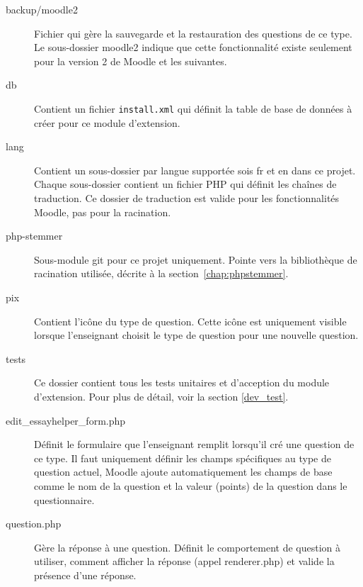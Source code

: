\begin{description}
 \item[backup/moodle2]
 Fichier qui g\`ere la sauvegarde et la restauration des questions de ce type.
 Le sous-dossier moodle2 indique que cette fonctionnalit\'e existe seulement pour la version 2 de Moodle et les suivantes.
 
 \item[db]
 
 Contient un fichier \texttt{install.xml} qui d\'efinit la table de base de donn\'ees \`a cr\'eer pour ce module d'extension.
 
 \item[lang]
 
 Contient un sous-dossier par langue support\'ee sois \og fr \fg{} et \og en \fg{} dans ce projet.
 Chaque sous-dossier contient un fichier PHP qui d\'efinit les cha\^ines de traduction.
 Ce dossier de traduction est valide pour les fonctionnalit\'es Moodle, pas pour la racination.
 
 \item[php-stemmer]
 
 Sous-module git pour ce projet uniquement.
 Pointe vers la biblioth\`eque de racination utilis\'ee,  d\'ecrite \`a la section~\ref{chap:phpstemmer}.
 
 \item[pix]
 
 Contient l'ic\^one du type de question.
 Cette ic\^one est uniquement visible lorsque l'enseignant choisit le type de question pour une nouvelle question.
 
 \item[tests]
 
 Ce dossier contient tous les tests unitaires et d'acception du module d'extension.
 Pour plus de d\'etail, voir la section \ref{dev_test}.
 
 \item[edit\_essayhelper\_form.php]
 
 D\'efinit le formulaire que l'enseignant remplit lorsqu'il cr\'e une question de ce type.
 Il faut uniquement d\'efinir les champs sp\'ecifiques au type de question actuel, Moodle ajoute automatiquement les champs de base comme le nom de la question et la valeur (points) de la question dans le questionnaire.
 
 \item[question.php]
 
 G\`ere la r\'eponse \`a une question.
 D\'efinit le comportement de question \`a utiliser, comment afficher la r\'eponse (appel renderer.php) et valide la pr\'esence d'une r\'eponse.
 

\end{description}
